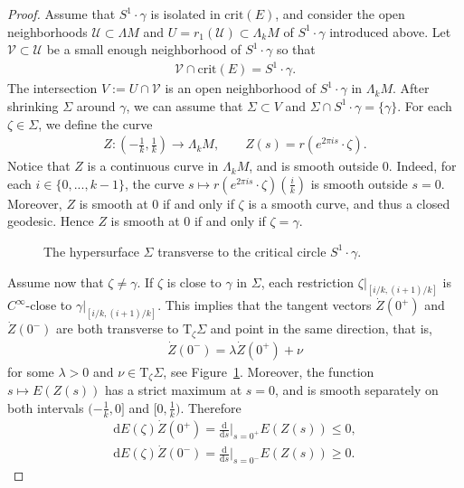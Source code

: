 \documentclass[reqno]{amsart}
\numberwithin{equation}{section}
\theoremstyle{personal}%
\theoremstyle{definition}
\newcommand{\diff}{\mathrm{d}}
\newcommand{\Tan}{\mathrm{T}}
\newcommand{\crit}{\mathrm{crit}}
\begin{document}
\begin{proof}
Assume that $S^1\cdot\gamma$ is isolated in $\crit(E)$, and consider the open neighborhoods $\mathcal U\subset\Lambda M$ and $U=r_1(\mathcal U)\subset\Lambda_kM$  of $S^1\cdot\gamma$ introduced above. Let $\mathcal{V}\subset\mathcal{U}$ be a small enough neighborhood of $S^1\cdot\gamma$ so that 
\begin{align*}
\mathcal V\cap\crit(E)=S^1\cdot\gamma.
\end{align*}
The intersection $V:=U\cap\mathcal{V}$ is an open neighborhood of $S^1\cdot\gamma$ in $\Lambda_kM$. After shrinking $\Sigma$ around $\gamma$, we can assume that $\Sigma\subset V$ and $\Sigma\cap S^1\cdot\gamma=\{\gamma\}$. For each $\zeta\in\Sigma$, we define the curve 
\begin{align*}
Z:(-\tfrac1k,\tfrac1k)\to\Lambda_k M,
\qquad
Z(s)=r(e^{2\pi is}\cdot\zeta).
\end{align*}
Notice that $Z$ is a continuous curve in $\Lambda_kM$, and is smooth outside $0$. Indeed, for each $i\in\{0,...,k-1\}$, the curve $s\mapsto r(e^{2\pi is}\cdot\zeta)(\tfrac ik)$ is smooth outside $s=0$. Moreover, $Z$ is smooth at $0$ if and only if $\zeta$ is a smooth curve, and thus a closed geodesic. Hence $Z$ is smooth at $0$ if and only if $\zeta=\gamma$.

\begin{figure}
\begin{center}
\begin{footnotesize}
 
\end{footnotesize}
\begin{small}
\caption{The hypersurface $\Sigma$ transverse to the critical circle $S^1\cdot\gamma$.}
\label{f:section}
\end{small}
\end{center}
\end{figure}


Assume now that $\zeta\neq\gamma$. If $\zeta$ is close to $\gamma$ in $\Sigma$, each restriction $\zeta|_{[i/k,(i+1)/k]}$ is $C^\infty$-close to $\gamma|_{[i/k,(i+1)/k]}$. This implies that the tangent vectors $\dot Z(0^+)$ and $\dot Z(0^-)$ are both transverse to $\Tan_\zeta\Sigma$ and point in the same direction, that is,
\begin{align*}
 \dot Z(0^-)=\lambda\dot Z(0^+)+\nu
\end{align*}
for some $\lambda>0$ and $\nu\in\Tan_\zeta\Sigma$, see Figure~\ref{f:section}. Moreover, the function $s\mapsto E(Z(s))$ has a strict maximum at $s=0$, and is smooth separately on both intervals $(-\tfrac1k,0]$ and $[0,\tfrac1k)$. Therefore
\begin{equation}\label{e:transverse_variations}
\begin{split}
\diff E(\zeta)\dot Z(0^+) = \tfrac{\diff}{\diff s}\big|_{s=0^+} E(Z(s))\leq 0,\\
\diff E(\zeta)\dot Z(0^-) = \tfrac{\diff}{\diff s}\big|_{s=0^-} E(Z(s))\geq 0. 
\end{split}
\end{equation}


\end{proof}
\end{document}
